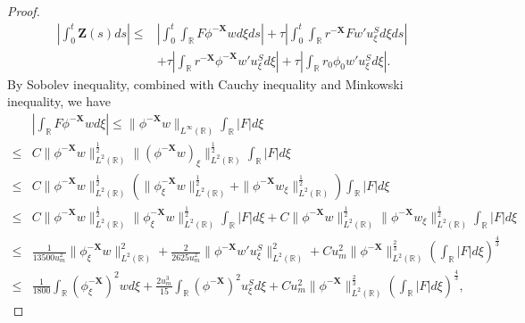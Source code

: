 \documentclass[10pt,reqno]{amsart}
\numberwithin{equation}{section}
\begin{document}
	\begin{proof}
		\begin{equation}
			\begin{aligned}
				\left|\int_{0}^t\mathbf{Z}(s)ds\right|
				\leq&\left| \int_{0}^t\int_{\mathbb{R}} F \phi^{-\mathbf{X}} w d\xi ds\right|+\tau\left|\int_{0}^t\int_{\mathbb{R}}r^{-\mathbf{X}}Fw'u_{\xi}^{S}d\xi ds\right|\\
				&+\tau\left|\int_{\mathbb{R}}r^{-\mathbf{X}}\phi^{-\mathbf{X}}w'u_{\xi}^{S}d\xi\right|+\tau\left|\int_{\mathbb{R}}r_0\phi_0w'u_{\xi}^{S}d\xi\right|.
			\end{aligned}	
		\end{equation}
		By Sobolev inequality, combined with Cauchy inequality and Minkowski inequality, we have
		\begin{equation}
			\begin{aligned}
				&\left| \int_{\mathbb{R}} F \phi^{-\mathbf{X}} w d\xi \right| \leq \| \phi^{-\mathbf{X}}w \|_{L^{\infty}(\mathbb{R})} \int_{\mathbb{R}} |F| d\xi \\
				\leq &C\| \phi^{-\mathbf{X}}w \|_{L^2(\mathbb{R})}^{\frac{1}{2}} \| \left(\phi^{-\mathbf{X}}w\right)_{\xi} \|_{L^2(\mathbb{R})}^{\frac{1}{2}} \int_{\mathbb{R}} |F| d\xi\\
				\leq&C\| \phi^{-\mathbf{X}}w \|_{L^2(\mathbb{R})}^{\frac{1}{2}}\left(\|\phi_{\xi}^{-\mathbf{X}}w\|_{L^2(\mathbb{R})}^{\frac{1}{2}}+\|\phi^{-\mathbf{X}}w_{\xi}\|_{L^2(\mathbb{R})}^{\frac{1}{2}}\right)\int_{\mathbb{R}} |F| d\xi\\
				\leq&C\| \phi^{-\mathbf{X}}w \|_{L^2(\mathbb{R})}^{\frac{1}{2}}\|\phi_{\xi}^{-\mathbf{X}}w\|_{L^2(\mathbb{R})}^{\frac{1}{2}}\int_{\mathbb{R}} |F| d\xi+C\| \phi^{-\mathbf{X}}w \|_{L^2(\mathbb{R})}^{\frac{1}{2}}\|\phi^{-\mathbf{X}}w_{\xi}\|_{L^2(\mathbb{R})}^{\frac{1}{2}}\int_{\mathbb{R}} |F| d\xi\\
				\leq& \frac{1}{13500u_m^2}\| \phi_{\xi}^{-\mathbf{X}}w \|_{L^2(\mathbb{R})}^2+\frac{2}{2625u_m^2}\|\phi^{-\mathbf{X}}w'u_{\xi}^S\|_{L^2(\mathbb{R})}^2 + C u_m^2 \| \phi^{-\mathbf{X}} \|_{L^2(\mathbb{R})}^{\frac{2}{3}} \left( \int_{\mathbb{R}} |F| d\xi \right)^{\frac{4}{3}}\\
				\leq& \frac{1}{1800}\int_{\mathbb{R}} \left(\phi_{\xi}^{-\mathbf{X}}\right)^2wd\xi+\frac{2u_m^3}{15}\int_{\mathbb{R}}\left(\phi^{-\mathbf{X}}\right)^2u_{\xi}^Sd\xi+Cu_m^2 \| \phi^{-\mathbf{X}} \|_{L^2(\mathbb{R})}^{\frac{2}{3}} \left( \int_{\mathbb{R}} |F| d\xi \right)^{\frac{4}{3}},
			\end{aligned}
		\end{equation}

\end{proof}
\end{document}
